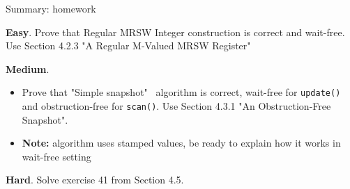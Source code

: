 \begin{frame}{Summary: homework}

\begin{homeworkcritical}
  \textbf{Easy}. Prove that Regular MRSW Integer construction is correct and wait-free.
  Use Section 4.2.3 "A Regular M-Valued MRSW Register"
\end{homeworkcritical}

\begin{homeworkcritical}
  \textbf{Medium}.
  \begin{itemize}      
    \item  Prove that "Simple snapshot" \ algorithm is correct, wait-free for \texttt{update()} and obstruction-free for \texttt{scan()}.
           Use Section 4.3.1 "An Obstruction-Free Snapshot".
    \item \textbf{Note:} algorithm uses stamped values, be ready to explain how it works in wait-free setting
  \end{itemize}
\end{homeworkcritical}

\begin{homeworkcritical}
  \textbf{Hard}. Solve exercise 41 from Section 4.5.
\end{homeworkcritical}

\end{frame}



